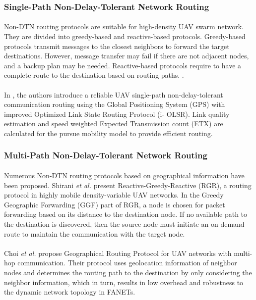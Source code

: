 \documentclass[a4paper,12pt]{report}
\begin{document}
\subsubsection{Single-Path Non-Delay-Tolerant Network Routing}
\paragraph{}
Non-DTN routing protocols are suitable for high-density UAV swarm network. They are divided into greedy-based and reactive-based protocols\cite{8772093}. Greedy-based protocols transmit messages to the closest neighbors to forward the target destinations. However, message transfer may fail if there are not adjacent nodes, and a backup plan may be needed\cite{8772093}. Reactive-based protocols require to have a complete route to the destination based on routing paths. .

\paragraph{}
In \cite{8553810}, the authors introduce a reliable UAV single-path non-delay-tolerant communication routing using the Global Positioning System (GPS) with improved Optimized Link State Routing Protocol (i- OLSR). Link quality estimation and speed weighted Expected Transmission count (ETX) are calculated for the pursue mobility model to provide efficient routing.

\subsubsection{Multi-Path Non-Delay-Tolerant Network Routing}
\paragraph{}
Numerous Non-DTN routing protocols based on geographical information have been proposed. Shirani {\it et al.} \cite{shirani2012delay} present Reactive-Greedy-Reactive (RGR), a routing protocol in highly mobile density-variable UAV networks. In the Greedy Geographic Forwarding (GGF) part of RGR, a node is chosen for packet forwarding based on its distance to the destination node. If no available path to the destination is discovered, then the source node must initiate an on-demand route to maintain the communication with the target node.

\paragraph{}
Choi {\it et al.} \cite{8436724} propose Geographical Routing Protocol for UAV networks with multi-hop communication. Their protocol uses geolocation information of neighbor nodes and determines the routing path to the destination by only considering the neighbor information, which in turn, results in low overhead and robustness to the dynamic network topology in FANETs. 
\end{document}
